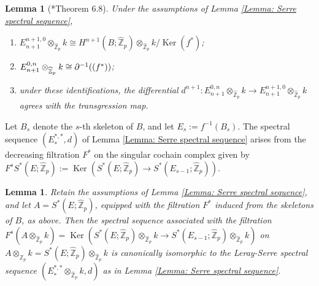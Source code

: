 \documentclass[11pt]{amsart}
\newtheorem{lemma}[theorem]{Lemma}
\theoremstyle{definition}
\numberwithin{equation}{section}
\numberwithin{equation}{section}
\newcommand\ZZ{\mathbb{Z}}
\let\Im\relax
\DeclareMathOperator{\Im}{Im}
\DeclareMathOperator{\Ker}{Ker}
\let\Im\relax
\DeclareMathOperator{\Im}{Im}
\begin{document}
\begin{lemma}[\cite{McCleary-spectral-sequence}*{Theorem 6.8}]
Under the assumptions of Lemma \ref{Lemma: Serre spectral sequence},
\begin{enumerate}[leftmargin=0.25in]
    \item $E^{n+1,0}_{n+1}\otimes_{\widehat{\ZZ}_p} k\cong H^{n+1}(B;\widehat{\ZZ}_p)\otimes_{\widehat{\ZZ}_p} k/\Ker(f^*)$;
    \item $E^{0,n}_{n+1}\otimes_{\widehat{\ZZ}_p} k\cong \partial^{-1}(\Im(f^*))$;
    \item under these identifications, the differential $d^{n+1}:E^{0,n}_{n+1}\otimes_{\widehat{\ZZ}_p} k\rightarrow E^{n+1,0}_{n+1}\otimes_{\widehat{\ZZ}_p} k$ agrees with the transgression map.
\end{enumerate}
\end{lemma}

Let $B_s$ denote the $s$-th skeleton of $B$, and let $E_s:=f^{-1}(B_s)$. The spectral sequence $(E^{*,*}_*,d)$ of Lemma \ref{Lemma: Serre spectral sequence} arises from the decreasing filtration $F^*$ on the singular cochain complex given by $F^sS^*(E;\widehat{\ZZ}_p):=\Ker(S^*(E;\widehat{\ZZ}_p)\rightarrow S^*(E_{s-1};\widehat{\ZZ}_p))$.

\begin{lemma}\label{Lemma: identification of spectral sequences tensoring with a field}
Retain the assumptions of Lemma \ref{Lemma: Serre spectral sequence}, and let $A=S^*(E;\widehat{\ZZ}_p)$, equipped with the filtration $F^*$ induced from the skeletons of $B$, as above. Then the spectral sequence associated with the filtration $F^s(A\otimes_{\widehat{\ZZ}_p} k)=\Ker(S^*(E;\widehat{\ZZ}_p)\otimes_{\widehat{\ZZ}_p} k\rightarrow S^*(E_{s-1};\widehat{\ZZ}_p)\otimes_{\widehat{\ZZ}_p} k)$ on $A\otimes_{\widehat{\ZZ}_p} k=S^*(E;\widehat{\ZZ}_p)\otimes_{\widehat{\ZZ}_p} k$ is canonically isomorphic to the Leray-Serre spectral sequence $(E^{*,*}_*\otimes_{\widehat{\ZZ}_p} k,d)$ as in Lemma \ref{Lemma: Serre spectral sequence}.
\end{lemma} 
\end{document}
